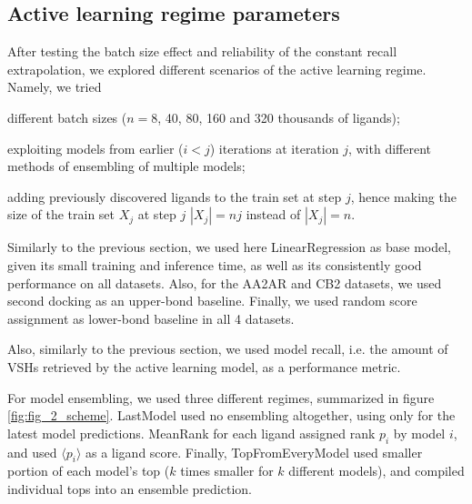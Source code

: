 \subsection{Active learning regime parameters}

After testing the batch size effect and reliability of the constant recall extrapolation, we explored different scenarios of the active learning regime. Namely, we tried
\begin{enumerate*}[label=(\roman*)]
    \item different batch sizes ($n=8$, 40, 80, 160 and 320 thousands of ligands);
    \item exploiting models from earlier ($i < j$) iterations at iteration $j$, with different methods of ensembling of multiple models;
    \item adding previously discovered ligands to the train set at step $j$, hence making the size of the train set $X_j$ at step $j$ $|X_j| = nj$ instead of $|X_j|=n$.
\end{enumerate*}

Similarly to the previous section, we used here LinearRegression as base model, given its small training and inference time, as well as its consistently good performance on all datasets. Also, for the AA2AR and CB2 datasets, we used second docking as an upper-bond baseline. Finally, we used random score assignment as lower-bond baseline in all 4 datasets. 

Also, similarly to the previous section, we used model recall, i.e. the amount of VSHs retrieved by the active learning model, as a performance metric.

For model ensembling, we used three different regimes, summarized in figure \ref{fig:fig_2_scheme}. LastModel used no ensembling altogether, using only for the latest model predictions. MeanRank for each ligand assigned rank $p_i$ by model $i$, and used $\langle p_i \rangle$ as a ligand score. Finally, TopFromEveryModel used smaller portion of each model's top ($k$ times smaller for $k$ different models), and compiled individual tops into an ensemble prediction.



